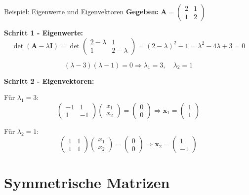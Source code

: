 \documentclass[a4paper, fontsize=7pt]{scrartcl}
\begin{document}
\begin{subbox}{Beispiel: Eigenwerte und Eigenvektoren}
\textbf{Gegeben:} $\mathbf{A} = \begin{pmatrix} 2 & 1 \\ 1 & 2 \end{pmatrix}$

\textbf{Schritt 1 - Eigenwerte:}
$$\det(\mathbf{A} - \lambda\mathbf{I}) = \det\begin{pmatrix} 2-\lambda & 1 \\ 1 & 2-\lambda \end{pmatrix} = (2-\lambda)^2 - 1 = \lambda^2 - 4\lambda + 3 = 0$$

$$(\lambda - 3)(\lambda - 1) = 0 \Rightarrow \lambda_1 = 3, \quad \lambda_2 = 1$$

\textbf{Schritt 2 - Eigenvektoren:}

Für $\lambda_1 = 3$:
$$\begin{pmatrix} -1 & 1 \\ 1 & -1 \end{pmatrix}\begin{pmatrix} x_1 \\ x_2 \end{pmatrix} = \begin{pmatrix} 0 \\ 0 \end{pmatrix} \Rightarrow \mathbf{x}_1 = \begin{pmatrix} 1 \\ 1 \end{pmatrix}$$

Für $\lambda_2 = 1$:
$$\begin{pmatrix} 1 & 1 \\ 1 & 1 \end{pmatrix}\begin{pmatrix} x_1 \\ x_2 \end{pmatrix} = \begin{pmatrix} 0 \\ 0 \end{pmatrix} \Rightarrow \mathbf{x}_2 = \begin{pmatrix} 1 \\ -1 \end{pmatrix}$$
\end{subbox}

\section{Symmetrische Matrizen}
\end{document}
